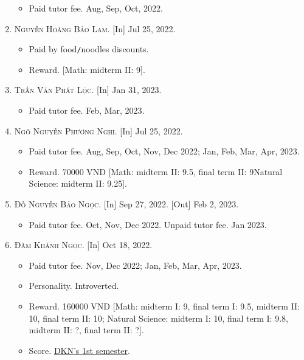\documentclass{article}
\begin{document}
\begin{enumerate}
	\begin{itemize}
		\item \textsf{Paid tutor fee.} Aug, Sep, Oct, 2022.
	\end{itemize}
	\item \textsc{Nguyễn Hoàng Bảo Lam.} \textsf{[In]} Jul 25, 2022.
	\begin{itemize}
		\item \textsf{Paid by food\texttt{/}noodles discounts.}
		\item \textsf{Reward.} [Math: midterm II: 9].
	\end{itemize}
	\item \textsc{Trần Văn Phát Lộc.} \textsf{[In]} Jan 31, 2023.
	\begin{itemize}
		\item \textsf{Paid tutor fee.} Feb, Mar, 2023.
	\end{itemize}
	\item \textsc{Ngô Nguyễn Phương Nghi.} \textsf{[In]} Jul 25, 2022.
	\begin{itemize}
		\item \textsf{Paid tutor fee.} Aug, Sep, Oct, Nov, Dec 2022; Jan, Feb, Mar, Apr, 2023.
		\item \textsf{Reward.} 70000 VND [Math: midterm II: 9.5, final term II: 9Natural Science: midterm II: 9.25].
	\end{itemize}
	\item \textsc{Đỗ Nguyễn Bảo Ngọc.} \textsf{[In]} Sep 27, 2022. \textsf{[Out]} Feb 2, 2023.
	\begin{itemize}
		\item \textsf{Paid tutor fee.} Oct, Nov, Dec 2022. \textsf{Unpaid tutor fee.} Jan 2023.
	\end{itemize}
	\item \textsc{Đàm Khánh Ngọc.} \textsf{[In]} Oct 18, 2022.
	\begin{itemize}
		\item \textsf{Paid tutor fee.} Nov, Dec 2022; Jan, Feb, Mar, Apr, 2023.
		\item \textsf{Personality.} Introverted.
		\item \textsf{Reward.} 160000 VND [Math: midterm I: 9, final term I: 9.5, midterm II: 10, final term II: 10; Natural Science: midterm I: 10, final term I: 9.8, midterm II: ?, final term II: ?].
		\item \textsf{Score.} \href{https://github.com/NQBH/hobby/blob/master/STEM/student/Dam_Khanh_Ngoc_grade_6_1st_semester.jpg}{DKN's 1st semester}.
	\end{itemize}

\end{enumerate}
\end{document}
